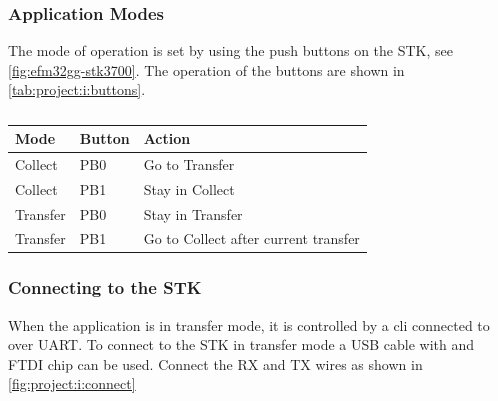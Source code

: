 \subsubsection{Application Modes}
The mode of operation is set by using the push buttons on the STK, see \autoref{fig:efm32gg-stk3700}.
The operation of the buttons are shown in \autoref{tab:project:i:buttons}.

\begin{table}[H]
  \centering
  \begin{tabular}{|l|l|l|}
    \hline
    Mode & Button & Action \\
    \hline \hline
    Collect & PB0 & Go to Transfer \\
    \hline
    Collect & PB1 & Stay in Collect \\
    \hline
    Transfer & PB0 & Stay in Transfer \\
    \hline
    Transfer & PB1 & Go to Collect after current transfer \\
    \hline
  \end{tabular}
  \caption{}
  \label{tab:project:i:buttons}
\end{table}

\subsubsection{Connecting to the STK}
When the application is in transfer mode, it is controlled by a \gls{cli} connected to over UART.
To connect to the STK in transfer mode a USB cable with and FTDI chip can be used.
Connect the RX and TX wires as shown in \autoref{fig:project:i:connect}

